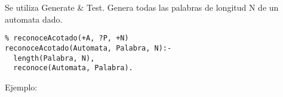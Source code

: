 \documentclass[10pt, a4paper,english,spanish,hidelinks]{article}
\begin{document}
Se utiliza Generate & Test.
Genera todas las palabras de longitud N de un automata dado.
\begin{verbatim}
% reconoceAcotado(+A, ?P, +N)
reconoceAcotado(Automata, Palabra, N):-
  length(Palabra, N),
  reconoce(Automata, Palabra).

\end{verbatim}

Ejemplo:
\end{document}
